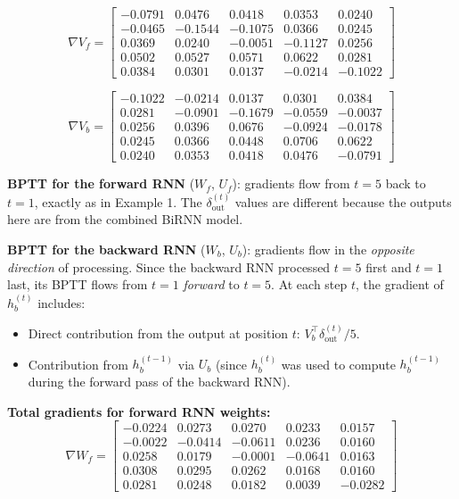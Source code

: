 \begin{equation}
    \nabla V_f = \begin{bmatrix}
    -0.0791 &  0.0476 &  0.0418 &  0.0353 &  0.0240 \\
    -0.0465 & -0.1544 & -0.1075 &  0.0366 &  0.0245 \\
     0.0369 &  0.0240 & -0.0051 & -0.1127 &  0.0256 \\
     0.0502 &  0.0527 &  0.0571 &  0.0622 &  0.0281 \\
     0.0384 &  0.0301 &  0.0137 & -0.0214 & -0.1022
    \end{bmatrix}
\end{equation}

\begin{equation}
    \nabla V_b = \begin{bmatrix}
    -0.1022 & -0.0214 &  0.0137 &  0.0301 &  0.0384 \\
     0.0281 & -0.0901 & -0.1679 & -0.0559 & -0.0037 \\
     0.0256 &  0.0396 &  0.0676 & -0.0924 & -0.0178 \\
     0.0245 &  0.0366 &  0.0448 &  0.0706 &  0.0622 \\
     0.0240 &  0.0353 &  0.0418 &  0.0476 & -0.0791
    \end{bmatrix}
\end{equation}

\textbf{BPTT for the forward RNN} ($W_f$, $U_f$): gradients flow from $t=5$ back to
$t=1$, exactly as in Example 1. The $\delta_{\text{out}}^{(t)}$ values are different
because the outputs here are from the combined BiRNN model.

\textbf{BPTT for the backward RNN} ($W_b$, $U_b$): gradients flow in the \emph{opposite
direction} of processing. Since the backward RNN processed $t=5$ first and $t=1$ last,
its BPTT flows from $t=1$ \emph{forward} to $t=5$. At each step $t$, the gradient of
$h_b^{(t)}$ includes:
\begin{itemize}
    \item Direct contribution from the output at position $t$: $V_b^\top \delta_{\text{out}}^{(t)}/5$.
    \item Contribution from $h_b^{(t-1)}$ via $U_b$ (since $h_b^{(t)}$ was used to compute
          $h_b^{(t-1)}$ during the forward pass of the backward RNN).
\end{itemize}

\textbf{Total gradients for forward RNN weights:}
\begin{equation}
    \nabla W_f = \begin{bmatrix}
    -0.0224 &  0.0273 &  0.0270 &  0.0233 &  0.0157 \\
    -0.0022 & -0.0414 & -0.0611 &  0.0236 &  0.0160 \\
     0.0258 &  0.0179 & -0.0001 & -0.0641 &  0.0163 \\
     0.0308 &  0.0295 &  0.0262 &  0.0168 &  0.0160 \\
     0.0281 &  0.0248 &  0.0182 &  0.0039 & -0.0282
    \end{bmatrix}
\end{equation}


